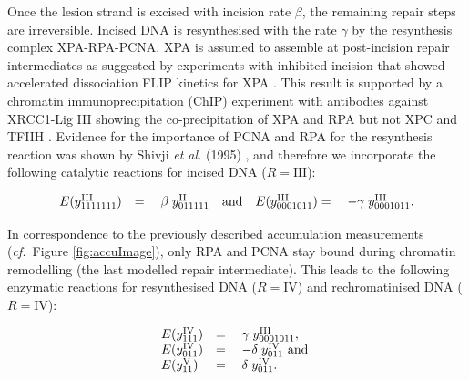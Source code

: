 Once the lesion strand is excised with incision rate $\beta$, the remaining repair steps are irreversible. Incised DNA is resynthesised with the rate $\gamma$ by the resynthesis complex  XPA-RPA-PCNA. XPA is assumed to assemble at post-incision repair intermediates as suggested by experiments with inhibited incision that showed accelerated dissociation FLIP kinetics for XPA  \cite{Luijsterburg2010}. This result is supported by a chromatin immunoprecipitation (ChIP) \label{par:schip} experiment with antibodies against XRCC1-Lig III showing the co-precipitation of XPA and RPA but not XPC and TFIIH \cite{Moser:2007:Mol-Cell:17643379}. Evidence for the importance of PCNA and RPA for the resynthesis reaction was shown by Shivji \textit{et al.} (1995) \cite{Shivji:1995:Biochemistry:7711023}, and therefore we incorporate the following catalytic reactions for incised DNA ($R= \text{III}$):  
            
\begin{align*}
\begin{array}{l l llll}
E(y_{1111111}^\text{III})&=&\;	\beta \;	y_{011111}^\text{II}	 \quad \text{and}
&E(y_{0001011}^\text{III})=&\;	-\gamma	\;y_{0001011}^\text{III}.	 \\
\end{array}
\end{align*}

In correspondence to the previously described accumulation measurements (\textit{cf.}\ Figure \ref{fig:accuImage}), only RPA and PCNA stay bound during chromatin remodelling (the last modelled repair intermediate). This leads to the following enzymatic reactions for resynthesised DNA  ($R= \text{IV}$) and rechromatinised DNA ($R= \text{IV}$):


\begin{align*}
\begin{array}{l l llll}
E(y_{111}^\text{IV})&=&\;	\gamma \;	y_{0001011}^\text{III},\\	 
E(y_{011}^\text{IV})&=&\;	-\delta	\;y_{011}^\text{IV} \text{ and }	 \\
 E(y_{11}^\text{V})&=&\;	\delta	\;y_{011}^\text{IV}.
\end{array}
\end{align*}

